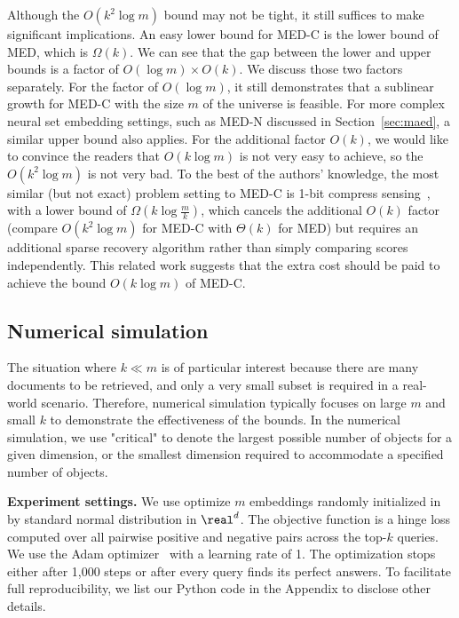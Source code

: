 Although the $O(k^2\log m)$ bound may not be tight, it still suffices to make significant implications. An easy lower bound for MED-C is the lower bound of MED, which is $\Omega(k)$. We can see that the gap between the lower and upper bounds is a factor of $O(\log m)\times O(k)$. We discuss those two factors separately. For the factor of $O(\log m)$, it still demonstrates that a sublinear growth for MED-C with the size $m$ of the universe is feasible. For more complex neural set embedding settings, such as MED-N discussed in Section~\ref{sec:maed}, a similar upper bound also applies. For the additional factor $O(k)$, we would like to convince the readers that $O(k\log m)$ is not very easy to achieve, so the $O(k^2 \log m)$ is not very bad. To the best of the authors' knowledge, the most similar (but not exact) problem setting to MED-C is 1-bit compress sensing~\citep{aksoylar2014information}, with a lower bound of $\Omega(k\log \frac{m}{k}) $, which cancels the additional $O(k)$ factor (compare $O(k^2\log m)$ for MED-C with $\Theta(k)$ for MED) but requires an additional sparse recovery algorithm rather than simply comparing scores independently. This related work suggests that the extra cost should be paid to achieve the bound $O(k\log m)$ of MED-C.


\subsection{Numerical simulation}

The situation where $k \ll m$ is of particular interest because there are many documents to be retrieved, and only a very small subset is required in a real-world scenario. Therefore, numerical simulation typically focuses on large $m$ and small $k$ to demonstrate the effectiveness of the bounds.
In the numerical simulation, we use "critical" to denote the largest possible number of objects for a given dimension, or the smallest dimension required to accommodate a specified number of objects.

\noindent\textbf{Experiment settings.} We use optimize $m$ embeddings randomly initialized in by standard normal distribution in $\real^d$. The objective function is a hinge loss computed over all pairwise positive and negative pairs across the top-$k$ queries. We use the Adam optimizer~\citep{kingma2014adam} with a learning rate of 1. The optimization stops either after 1,000 steps or after every query finds its perfect answers. To facilitate full reproducibility, we list our Python code in the Appendix to disclose other details.

